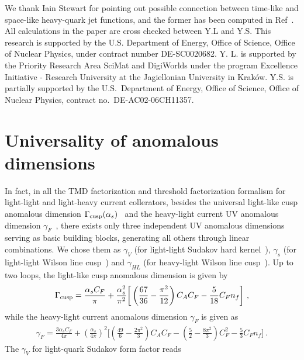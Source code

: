 \documentclass[a4paper,11pt]{article}
\begin{document}
\acknowledgments
We thank Iain Stewart for pointing out possible connection between time-like and space-like heavy-quark jet functions, and the former
has been computed in Ref~\cite{Jain:2008gb}. All calculations in the paper are cross checked between Y.L and Y.S. This research is supported by the U.S. Department of Energy, Office of Science, Office of Nuclear Physics, under contract number DE-SC0020682.
Y. L. is supported by the Priority Research Area SciMat and DigiWorlds under the program Excellence Initiative - Research University at the Jagiellonian University in Krak\'{o}w. Y.S. is partially supported by the U.S.~Department of Energy, Office of Science, Office of Nuclear Physics, contract no.~DE-AC02-06CH11357.


\appendix
\section{Universality of anomalous dimensions}\label{sec:anomalousd}
 In fact, in all the TMD factorization and threshold factorization formalism for light-light and light-heavy current collerators, besides the universal light-like cusp anomalous dimension $\Gamma_{\rm cusp}(\alpha_s)$~\cite{Korchemsky:1987wg} and the heavy-light current UV anomalous dimension $\gamma_F$~\cite{Ji:1991pr, Chetyrkin:2003vi}, there exists only three independent UV anomalous dimensions serving as basic building blocks, generating all others through linear combinations. We chose them as $\gamma_V$ (for light-light Sudakov hard kernel~\cite{Moch:2005id,Becher:2006mr}), $\gamma_s$ (for light-light Wilson line cusp~\cite{Korchemskaya:1992je}) and $\gamma_{HL}$ (for heavy-light Wilson line cusp~\cite{Korchemsky:1992xv}). Up to two loops, 
the light-like cusp anomalous dimension is given by
\begin{align}\label{eq:resultcusp}
\Gamma_{\rm cusp}=\frac{\alpha_sC_F}{\pi}+\frac{\alpha_s^2}{\pi^2}\bigg[\left(\frac{67}{36}-\frac{\pi^2}{12}\right)C_A C_F-\frac{5}{18}C_Fn_f\bigg] \ ,
\end{align}
while the heavy-light current anomalous dimension $\gamma_F$ is given as~\cite{Ji:1991pr, Chetyrkin:2003vi}
\begin{align}
 \gamma_F=\frac{3\alpha_sC_F}{4 \pi }+ \left(\frac{\alpha_s}{4 \pi }\right)^2 \bigg[\left(\frac{49}{6}-\frac{2 \pi ^2}{3}\right)C_AC_F-\left(\frac{5}{2}-\frac{8 \pi ^2}{3}\right)C_F^2-\frac{5}{3}C_Fn_f\bigg]\ .
 \end{align}
The $\gamma_V$ for light-quark Sudakov form factor reads~\cite{Moch:2005id,Becher:2006mr}
\end{document}
